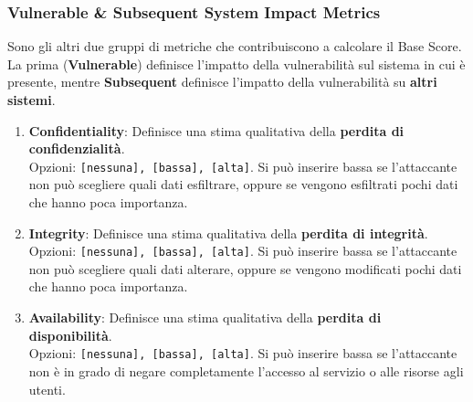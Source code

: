 \documentclass{article}
\begin{document}
\subsubsection{Vulnerable \& Subsequent System Impact Metrics}
Sono gli altri due gruppi di metriche che contribuiscono a calcolare il Base Score. La prima (\textbf{Vulnerable}) definisce l'impatto della vulnerabilità sul sistema in cui è presente, mentre \textbf{Subsequent} definisce l'impatto della vulnerabilità su \textbf{altri sistemi}. 

\begin{enumerate}
	\item \textbf{Confidentiality}: Definisce una stima qualitativa della \textbf{perdita di confidenzialità}.\\ Opzioni: \verb|[nessuna], [bassa], [alta]|. Si può inserire bassa se l’attaccante non può scegliere quali dati esfiltrare, oppure se vengono esfiltrati pochi dati che hanno poca importanza.
	
	\item \textbf{Integrity}: Definisce una stima qualitativa della \textbf{perdita di integrità}.\\ Opzioni: \verb|[nessuna], [bassa], [alta]|. Si può inserire bassa se l’attaccante non può scegliere quali dati alterare, oppure se vengono modificati pochi dati che hanno poca importanza.
	
	\item \textbf{Availability}: Definisce una stima qualitativa della \textbf{perdita di disponibilità}.\\ Opzioni: \verb|[nessuna], [bassa], [alta]|. Si può inserire bassa se l’attaccante non è in grado di negare completamente l’accesso al servizio o alle risorse agli utenti.
\end{enumerate}
\end{document}
